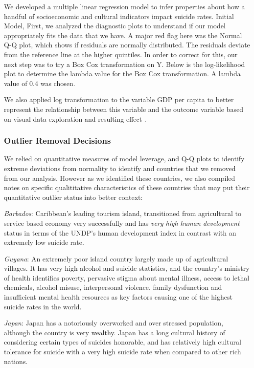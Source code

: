 \documentclass[]{article}
\begin{document}
We developed a multiple linear regression model to infer properties
about how a handful of socioeconomic and cultural indicators impact
suicide rates. Initial Model, First, we analyzed the diagnostic plots to
understand if our model appropriately fits the data that we have. A
major red flag here was the Normal Q-Q plot, which shows if residuals
are normally distributed. The residuals deviate from the reference line
at the higher quintiles. In order to correct for this, our next step was
to try a Box Cox transformation on Y. Below is the log-likelihood plot
to determine the lambda value for the Box Cox transformation. A lambda
value of 0.4 was chosen.

We also applied log transformation to the variable GDP per capita to
better represent the relationship between this variable and the outcome
variable based on visual data exploration and resulting effect .

\subsubsection{Outlier Removal
Decisions}\label{outlier-removal-decisions}

We relied on quantitative measures of model leverage, and Q-Q plots to
identify extreme deviations from normality to identify and countries
that we removed from our analysis. However as we identified these
countries, we also compiled notes on specific qualititative
characteristics of these countries that may put their quantitative
outlier status into better context:

\emph{Barbados}: Caribbean's leading tourism island, transitioned from
agricultural to service based economy very successfully and has
\emph{very high human development} status in terms of the UNDP's human
development index in contrast with an extremely low suicide rate.

\emph{Guyana}: An extremely poor island country largely made up of
agricultural villages. It has very high alcohol and suicide statistics,
and the country's ministry of health identifies poverty, pervasive
stigma about mental illness, access to lethal chemicals, alcohol misuse,
interpersonal violence, family dysfunction and insufficient mental
health resources as key factors causing one of the highest suicide rates
in the world.

\emph{Japan}: Japan has a notoriously overworked and over stressed
population, although the country is very wealthy. Japan has a long
cultural history of considering certain types of suicides honorable, and
has relatively high cultural tolerance for suicide with a very high
suicide rate when compared to other rich nations.
\end{document}
